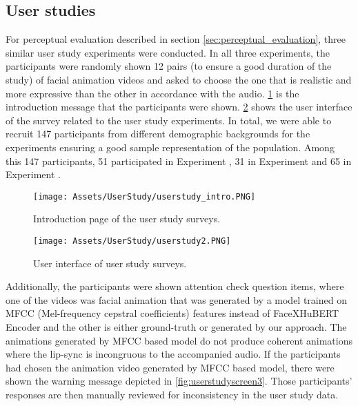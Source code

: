 \documentclass[10pt,twocolumn,letterpaper]{article}
\newcommand{\RNum}[1]{\uppercase\expandafter{\romannumeral #1\relax}}
\begin{document}
\subsection{User studies}
For perceptual evaluation described in section \cref{sec:perceptual_evaluation}, three similar user study experiments were conducted. In all three experiments, the participants were randomly shown 12 pairs (to ensure a good duration of the study) of facial animation videos and asked to choose the one that is realistic and more expressive than the other in accordance with the audio. \cref{fig:userstudyscreen1} is the introduction message that the participants were shown. \cref{fig:userstudyscreen2} shows the user interface of the survey related to the user study experiments. In total, we were able to recruit 147 participants from different demographic backgrounds for the experiments ensuring a good sample representation of the population. Among this 147 participants, 51 participated in Experiment \RNum{1}, 31 in Experiment \RNum{2} and 65 in Experiment \RNum{3}. 
\begin{figure}[h!]
  \centering
  \texttt{[image: Assets/UserStudy/userstudy\_intro.PNG]}
  \caption{Introduction page of the user study surveys.}
  \label{fig:userstudyscreen1}
\end{figure}
\vspace{-1em}
\begin{figure}[h!]
  \centering
  \texttt{[image: Assets/UserStudy/userstudy2.PNG]}
  \caption{User interface of user study surveys.}
  \label{fig:userstudyscreen2}
\end{figure}


Additionally, the participants were shown attention check question items, where one of the videos was facial animation that was generated by a model trained on MFCC (Mel-frequency cepstral coefficients) features instead of FaceXHuBERT Encoder and the other is either ground-truth or generated by our approach. The animations generated by MFCC based model do not produce coherent animations where the lip-sync is incongruous to the accompanied audio. If the participants had chosen the animation video generated by MFCC based model, there were shown the warning message depicted in \cref{fig:userstudyscreen3}. Those participants' responses are then manually reviewed for inconsistency in the user study data. 


 
\end{document}
